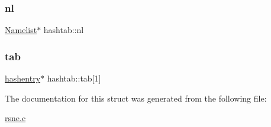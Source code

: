 \subsubsection{\texorpdfstring{nl}{nl}}
{\footnotesize\ttfamily \hyperlink{struct_namelist}{Namelist}$\ast$ hashtab\+::nl}

\mbox{\label{structhashtab_a8d4ae557e2e7cea71eb89e7c9af5060e}} 
\subsubsection{\texorpdfstring{tab}{tab}}
{\footnotesize\ttfamily \hyperlink{structhashentry}{hashentry}$\ast$ hashtab\+::tab\mbox{[}1\mbox{]}}



The documentation for this struct was generated from the following file\+:\begin{DoxyCompactItemize}
\item 
\hyperlink{rsne_8c}{rsne.\+c}\end{DoxyCompactItemize}
